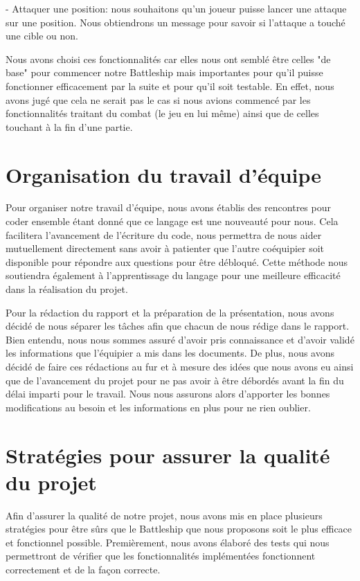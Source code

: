 \documentclass[12pt]{article}
\begin{document}
- Attaquer une position: nous souhaitons qu'un joueur puisse lancer une attaque sur une position. Nous obtiendrons un message pour savoir si l'attaque a touché une cible ou non.

Nous avons choisi ces fonctionnalités car elles nous ont semblé être celles "de base" pour commencer notre Battleship mais importantes pour qu'il puisse fonctionner efficacement par la suite et pour qu'il soit testable. En effet, nous avons jugé que cela ne serait pas le cas si nous avions commencé par les fonctionnalités traitant du combat (le jeu en lui même) ainsi que de celles touchant à la fin d'une partie.

\section{Organisation du travail d'équipe}

Pour organiser notre travail d'équipe, nous avons établis des rencontres pour coder ensemble étant donné que ce langage est une nouveauté pour nous. Cela facilitera l'avancement de l'écriture du code, nous permettra de nous aider mutuellement directement sans avoir à patienter que l'autre coéquipier soit disponible pour répondre aux questions pour être débloqué. Cette méthode nous soutiendra également à l'apprentissage du langage pour une meilleure efficacité dans la réalisation du projet.

Pour la rédaction du rapport et la préparation de la présentation, nous avons décidé de nous séparer les tâches afin que chacun de nous rédige dans le rapport. Bien entendu, nous nous sommes assuré d'avoir pris connaissance et d'avoir validé les informations que l'équipier a mis dans les documents. De plus, nous avons décidé de faire ces rédactions au fur et à mesure des idées que nous avons eu ainsi que de l'avancement du projet pour ne pas avoir à être débordés avant la fin du délai imparti pour le travail. Nous nous assurons alors d'apporter les bonnes modifications au besoin et les informations en plus pour ne rien oublier.

\section{Stratégies pour assurer la qualité du projet}

Afin d'assurer la qualité de notre projet, nous avons mis en place plusieurs stratégies pour être sûrs que le Battleship que nous proposons soit le plus efficace et fonctionnel possible. Premièrement, nous avons élaboré des tests qui nous permettront de vérifier que les fonctionnalités implémentées fonctionnent correctement et de la façon correcte.
\end{document}
